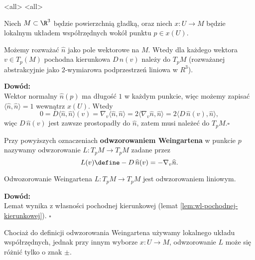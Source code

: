  \mode*
\mode<all>{}
\mode<all>{}

\begin{frame}
\begin{lemat}
Niech $M\subset \R^3$ będzie powierzchnią gładką, oraz niech $x\colon U\to M$ będzie lokalnym układem współrzędnych wokół punktu $p\in x(U)$. 

\pause Możemy rozważać $\widehat{n}$ jako pole wektorowe na $M$. \pause Wtedy dla każdego wektora $v\in T_p(M)$ pochodna kierunkowa $D\,\widehat{n}(v)$ należy do $T_pM$ (rozważanej abstrakcyjnie jako $2$-wymiarowa podprzestrzeń liniowa w $R^3$).
\end{lemat}

\end{frame}
\begin{frame}

\textcolor{ared}{\textbf{Dowód:}}\\\pause 
Wektor normalny $\widehat{n}(p)$ ma długość $1$ w każdym punkcie, więc możemy zapisać $\langle\widehat{n},\widehat{n}\rangle=1$ wewnątrz $x(U)$.
\pause {}
Wtedy \[0=D\langle\widehat{n},\widehat{n}\rangle(v)=\nabla_v \langle\widehat{n},\widehat{n}\rangle=2\langle\nabla_v \widehat{n},\widehat{n}\rangle=2\langle D\,\widehat{n}(v),\widehat{n}\rangle,\] \pause więc $D\,\widehat{n}(v)$ jest zawsze prostopadły do $\widehat{n}$, zatem musi należeć do $T_pM$.\hfill $\square$

\end{frame}
\begin{frame}
\begin{definicja}
Przy powyższych oznaczeniach \textbf{odwzorowaniem Weingartena} w punkcie $p$ nazywamy odwzorowanie $L\colon T_pM\to T_pM$ zadane przez \[L(v)\define -D\,\widehat{n}(v)=-\nabla_v\widehat{n}.\]
\end{definicja}
\pause
\begin{lemat}
Odwozorowanie Weingartena $L\colon T_pM\to T_pM$ jest odwzorowaniem liniowym.
\end{lemat}
\pause \textcolor{ared}{\textbf{Dowód:}}\\
Lemat wynika z własności pochodnej kierunkowej (lemat \ref{lem:wl-pochodnej-kierunkowej}).
\hfill $\square$

\end{frame}

\begin{frame}
\begin{uwaga}
Chociaż do definicji odwzorowania Weingartena używamy lokalnego układu współrzędnych, jednak przy innym wyborze $x\colon U\to M$, odwzorowanie $L$ może się różnić tylko o znak $\pm$.
\end{uwaga}
\end{frame}



